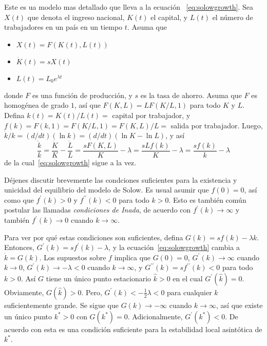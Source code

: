 Este es ua modelo mas detallado que lleva a la ecuación ~\eqref{eq:solowgrowth}. Sea $X\left(t\right)$ que denota el ingreso nacional, $K\left(t\right)$ el capital, y
$L\left(t\right)$ el número de trabajadores en un país en un tiempo $t$. Asuma que
\begin{multicols}{3}
\begin{itemize}
	\item $X\left(t\right)=F\left(K(t),L(t)\right)$
	\item $\dot{K}\left(t\right)=sX\left(t\right)$
	\item $L\left(t\right)=L_{0}e^{\lambda t}$
\end{itemize}
\end{multicols}
donde $F$ es una función de producción, y $s$ es la tasa de ahorro. Asuma que $F$ es homogénea de grado $1$, así que $F\left(K,L\right)=LF\left(K/L,1\right)$ para todo $K$ y $L$.
Defina $k\left(t\right) =K\left(t\right)/L\left(t\right)=$ capital por trabajador, y $f\left(k\right)=F\left(k,1\right)=F\left(K/L,1\right)=F\left(K,L\right)/L=$ salida por trabajador. Luego,  $\dot{k}/k=\left(d/dt\right)\left(\ln k\right)=\left(d/dt\right)\left(\ln K-\ln L\right)$, y así
\begin{equation}
\frac{\dot{k}}{k}=\frac{\dot{K}}{K}-\dfrac{\dot{L}}{L}=\frac{sF\left(K,L\right)}{K}-\lambda=\frac{sLf\left(k\right)}{K}-\lambda=\frac{sf\left(k\right)}{k}-\lambda
\end{equation}
de la cual~\eqref{eq:solowgrowth} sigue a la vez.

\begin{remark}
	Déjenes discutir brevemente las condciones suficientes para la existencia y unicidad del equilibrio del modelo de Solow. Es usual asumir que $f\left(0\right)=0$, así como que $f^{\prime}\left(k\right)>0$ y $f^{\prime\prime}\left(k\right)<0$ para todo $k>0$. Esto es también común postular las llamadas \emph{condiciones de Inada}, de acuerdo con $f^{\prime}\left(k\right)\rightarrow\infty$ y también $f^{\prime}\left(k\right)\rightarrow0$ cuando $k\rightarrow\infty$.
	
	Para ver por qué estas condiciones son suficientes, defina $G\left(k\right)=sf\left(k\right)-\lambda k$. Entonces, $G^{\prime}\left(k\right)=sf^{\prime}\left(k\right)-\lambda$, y la ecuación~\eqref{eq:solowgrowth} cambia a $\dot{k}=G\left(k\right)$. Los supuestos sobre $f$ implica que $G\left(0\right)=0$, $G^{\prime}\left(k\right)\rightarrow\infty$ cuando $k\rightarrow0$, $G^{\prime}\left(k\right)\rightarrow-\lambda<0$ cuando $k\rightarrow\infty$, y $G^{\prime\prime}\left(k\right)=sf^{\prime\prime}\left(k\right)<0$ para todo $k>0$. Así $G$ tiene un único punto estacionario $\hat{k}>0$ en el cual $G^{\prime}\left(\hat{k}\right)=0$. Obviamente, $G\left(\hat{k}\right)>0$. Pero, $G^{\prime}\left(k\right)<-\frac{1}{2}\lambda<0$ para cualquier $k$ suficientemente grande. Se sigue que $G\left(k\right)\rightarrow-\infty$ cuando $k\rightarrow\infty$, así que existe un único punto $k^{\ast}>0$ con $G\left(k^{\ast}\right)=0$. Adicionalmente, $G^{\prime}\left(k^{\ast}\right)<0$. De acuerdo con %
	esta es una condición suficiente para la estabilidad local asintótica de $k^{\ast}$.
\end{remark}